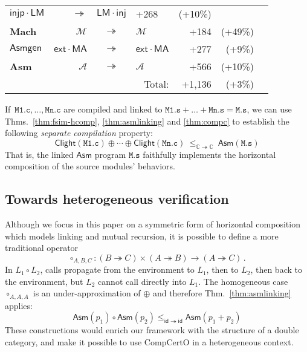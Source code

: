 \documentclass[sigplan,screen,review]{acmart}
\newcommand{\kw}[1]{\ensuremath{ \mathsf{#1} }}
\newcommand{\cc}[2]{{ \kw{#1#2} }}
\newcommand{\filltint}{!30}
\newcommand{\tbltint}{\filltint}
\begin{document}
\begin{table}
\begin{tabular}{lrclrrr}
      $\kw{injp} \cdot \cc{L}{M} $ &
      $\twoheadrightarrow$ &
      $\cc{L}{M} \cdot \kw{inj}$ &
      +268 & (+10\%)
    \\
    \rowcolor{ACMOrange\tbltint}
    \textbf{Mach} &
      $\mathcal{M}$ &
      $\twoheadrightarrow$ &
      $\mathcal{M}$ &
      +184 & (+49\%)
    \\
    \kw{Asmgen} &
      $\kw{ext} \cdot \cc{M}{A}$ &
      $\twoheadrightarrow$ &
      $\kw{ext} \cdot \cc{M}{A}$ &
      +277 & (+9\%)
    \\
    \rowcolor{ACMRed\tbltint}
    \textbf{Asm} &
      $\mathcal{A}$ &
      $\twoheadrightarrow$ &
      $\mathcal{A}$ &
      +566 & (+10\%)
    \\
    \midrule
    \multicolumn{4}{r}{Total: \quad} &
      +1{,}136 & (+3\%)
    \\
    \bottomrule
  \end{tabular}
\end{table}


\begin{corollary} \label{cor:sepcomp} %
If\,
$\mathtt{M1.c}, \ldots, \mathtt{Mn.c}$
are compiled and linked to
$\mathtt{M1.s} + \ldots + \mathtt{Mn.s} = \mathtt{M.s}$,
we can use
Thms.~\ref{thm:fsim-hcomp},
\ref{thm:asmlinking} and
\ref{thm:compc}
to establish the following \emph{separate compilation} property:
\[
  \kw{Clight}(\mathtt{M1.c}) \oplus \cdots \oplus \kw{Clight}(\mathtt{Mn.c})
  \:\le_{\mathbb{C} \twoheadrightarrow \mathbb{C}}\:
  \kw{Asm}(\mathtt{M.s})
\]
That is,
the linked \kw{Asm} program
$\mathtt{M.s}$
faithfully implements
the horizontal composition of the source modules' behaviors.
\end{corollary}


\subsection{Towards heterogeneous verification} %

Although we focus in this paper on a symmetric form
of horizontal composition
which models linking and mutual recursion,
it is possible to define a more traditional operator
\[
  {\circ_{A,B,C}} : (B \twoheadrightarrow C) \times (A \twoheadrightarrow B)
    \rightarrow (A \twoheadrightarrow C)
  \,.
\]
In $L_1 \circ L_2$,
calls propagate from the environment to $L_1$,
then to $L_2$,
then back to the environment,
but $L_2$ cannot call directly into $L_1$.
The homogeneous case $\circ_{A,A,A}$ is
an under-approximation of $\oplus$
and therefore Thm.~\ref{thm:asmlinking} applies:
\[
  \kw{Asm}(p_1) \circ \kw{Asm}(p_2)
  \le_{\kw{id} \twoheadrightarrow \kw{id}}
  \kw{Asm}(p_1 + p_2)
\]
These constructions would
enrich our framework with the structure of a double category,
and make it possible to use CompCertO
in a heterogeneous context.
\end{document}
